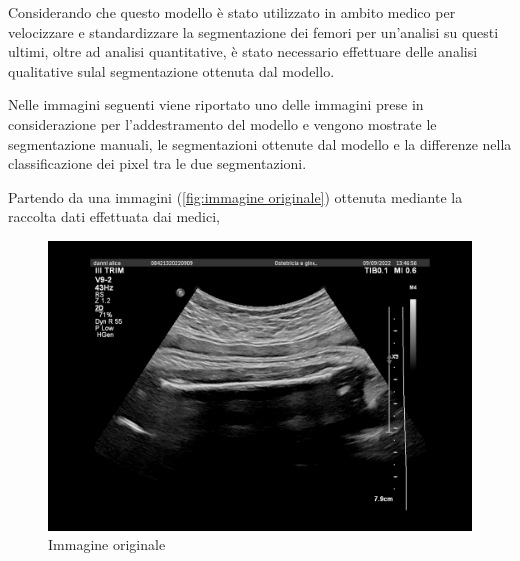 Considerando che questo modello \`e stato utilizzato in ambito medico per velocizzare e standardizzare 
la segmentazione dei femori per un'analisi su questi ultimi, oltre ad analisi quantitative, \`e stato 
necessario effettuare delle analisi qualitative sulal segmentazione ottenuta dal modello.

Nelle immagini seguenti viene riportato uno delle immagini prese in considerazione per l'addestramento del modello
e vengono mostrate le segmentazione manuali, le segmentazioni ottenute dal modello e la differenze 
nella classificazione dei pixel tra le due segmentazioni.


Partendo da una immagini (\autoref{fig:immagine originale}) ottenuta mediante la raccolta dati effettuata dai medici, 

\begin{figure}[!ht]
	\begin{adjustbox}{width=0.8\columnwidth, center}
    \includegraphics{./images/image.png}
  \end{adjustbox}
  \caption{Immagine originale}
  \label{fig:immagine originale}
\end{figure}

